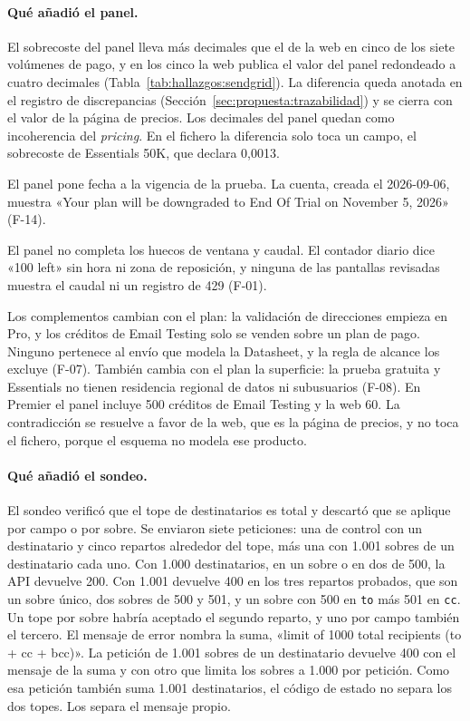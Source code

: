 \paragraph{Qué añadió el panel.} El sobrecoste del panel lleva más decimales
que el de la web en cinco de los siete volúmenes de pago, y en los cinco la web
publica el valor del panel redondeado a cuatro decimales
(Tabla~\ref{tab:hallazgos:sendgrid}). La
diferencia queda anotada en el registro de discrepancias
(Sección~\ref{sec:propuesta:trazabilidad}) y se cierra con el valor de la página de precios.
Los decimales del panel quedan como incoherencia del \textit{pricing}.
En el fichero la diferencia solo toca un campo, el sobrecoste de Essentials 50K, que declara 0,0013.

El panel pone fecha a la vigencia de la prueba. La cuenta, creada el
2026-09-06, muestra «Your plan will be downgraded to End Of Trial on November
5, 2026» (F-14).

El panel no completa los huecos de ventana y caudal. El contador diario dice
«100 left» sin hora ni zona de reposición, y ninguna de las pantallas
revisadas muestra el caudal ni un registro de 429 (F-01).

Los complementos cambian con el plan: la validación de direcciones empieza en
Pro, y los créditos de Email Testing solo se venden sobre un plan de pago.
Ninguno pertenece al envío que modela la Datasheet, y la regla de
alcance los excluye (F-07). También cambia con el plan la superficie: la
prueba gratuita y Essentials no tienen residencia regional de datos ni
subusuarios (F-08). En Premier el panel incluye 500 créditos de Email Testing
y la web 60.
La contradicción se resuelve a favor de la web, que es la página de precios, y no toca el fichero, porque el esquema no modela ese producto.

\paragraph{Qué añadió el sondeo.} El sondeo verificó que el tope de
destinatarios es total y descartó que se aplique por campo o por sobre. Se
enviaron siete peticiones: una de control con un destinatario y cinco repartos
alrededor del tope, más una con 1.001 sobres de un destinatario cada uno. Con
1.000 destinatarios, en un sobre o en dos de 500, la API devuelve 200. Con
1.001 devuelve 400 en los tres repartos probados, que son un sobre único, dos
sobres de 500 y 501, y un sobre con 500 en \texttt{to} más 501 en \texttt{cc}.
Un tope por sobre habría aceptado el segundo reparto, y uno por campo también
el tercero. El mensaje de error nombra la suma, «limit of 1000 total recipients
(to + cc + bcc)». La petición de 1.001 sobres de un destinatario devuelve 400
con el mensaje de la suma y con otro que limita los sobres a 1.000 por
petición. Como esa petición también suma 1.001 destinatarios, el código de
estado no separa los dos topes. Los separa el mensaje propio.

